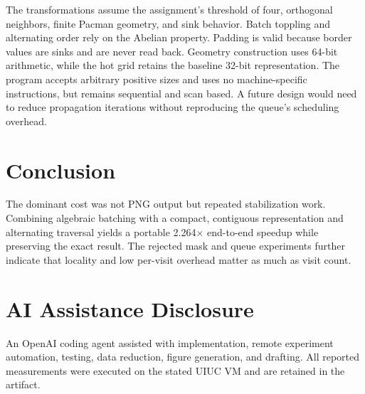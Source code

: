 \documentclass[sigplan,screen,nonacm]{acmart}
\begin{document}
The transformations assume the assignment's threshold of four, orthogonal
neighbors, finite Pacman geometry, and sink behavior. Batch toppling and
alternating order rely on the Abelian property. Padding is valid because border
values are sinks and are never read back. Geometry construction uses 64-bit
arithmetic, while the hot grid retains the baseline 32-bit representation. The
program accepts arbitrary positive sizes and uses no machine-specific
instructions, but remains sequential and scan based. A future design would
need to reduce propagation iterations without reproducing the queue's
scheduling overhead.

\section{Conclusion}
The dominant cost was not PNG output but repeated stabilization work. Combining
algebraic batching with a compact, contiguous representation and alternating
traversal yields a portable 2.264$\times$ end-to-end speedup while preserving
the exact result. The rejected mask and queue experiments further indicate
that locality and low per-visit overhead matter as much as visit count.

\section*{AI Assistance Disclosure}
An OpenAI coding agent assisted with implementation, remote experiment
automation, testing, data reduction, figure generation, and drafting. All
reported measurements were executed on the stated UIUC VM and are retained in
the artifact.
\end{document}
